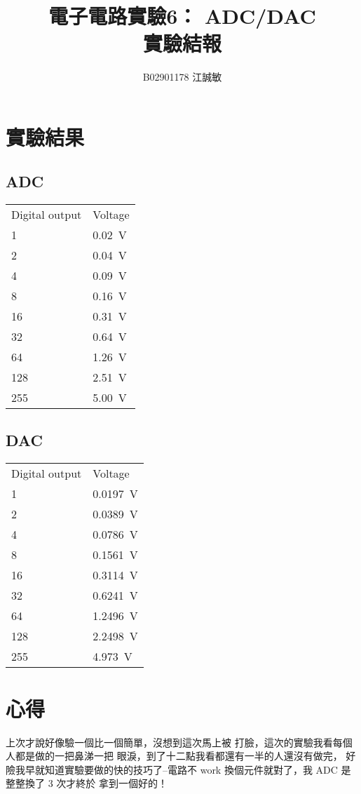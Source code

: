 \documentclass[12pt, a4paper]{article}
\title{ \bf {\Huge 電子電路實驗6： ADC/DAC}\\ 實驗結報}
\author{B02901178 江誠敏}
\begin{document}
\maketitle


\section{實驗結果}
\subsection{ADC}
\begin{center}
\begin{tabular}{p{3cm}p{3cm}}
	\hline
  Digital output & Voltage\\
	\hhline{==}
  1 & \SI{0.02}\V \\
	\hline
  2 & \SI{0.04}\V \\
	\hline
  4 & \SI{0.09}\V \\
	\hline
  8 & \SI{0.16}\V \\
	\hline
  16 & \SI{0.31}\V \\
	\hline
  32 & \SI{0.64}\V \\
	\hline
  64 & \SI{1.26}\V \\
	\hline
  128 & \SI{2.51}\V \\
	\hline
  255 & \SI{5.00}\V \\
	\hline
\end{tabular}
\end{center}

\subsection{DAC}
\begin{center}
\begin{tabular}{p{3cm}p{3cm}}
	\hline
  Digital output & Voltage\\
	\hhline{==}
  1 & \SI{0.0197}\V \\
	\hline
  2 & \SI{0.0389}\V \\
	\hline
  4 & \SI{0.0786}\V \\
	\hline
  8 & \SI{0.1561}\V \\
	\hline
  16 & \SI{0.3114}\V \\
	\hline
  32 & \SI{0.6241}\V \\
	\hline
  64 & \SI{1.2496}\V \\
	\hline
  128 & \SI{2.2498}\V \\
	\hline
  255 & \SI{4.973}\V \\
	\hline
\end{tabular}
\end{center}

\section{心得}
上次才說好像驗一個比一個簡單，沒想到這次馬上被
打臉，這次的實驗我看每個人都是做的一把鼻涕一把
眼淚，到了十二點我看都還有一半的人還沒有做完，
好險我早就知道實驗要做的快的技巧了–電路不 work
換個元件就對了，我 ADC 是整整換了 3 次才終於
拿到一個好的！
\end{document}
